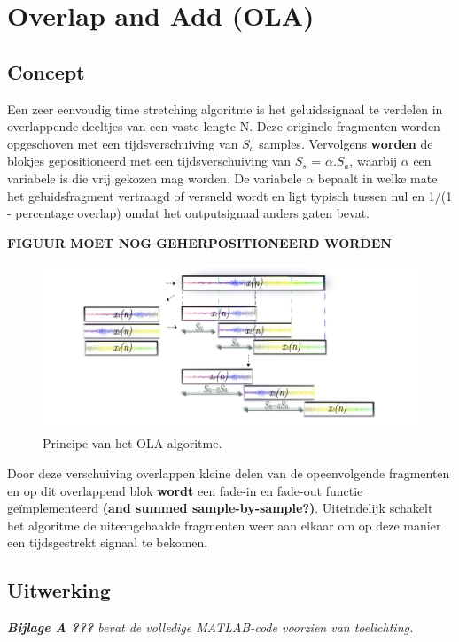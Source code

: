 \documentclass[12pt]{report}
\begin{document}
\section{Overlap and Add (OLA)}
\subsection{Concept}
\label{subsec:OLA_concept}
Een zeer eenvoudig time stretching algoritme is het geluidssignaal te verdelen in overlappende deeltjes van een vaste lengte N. Deze originele fragmenten worden opgeschoven met een tijdsverschuiving van $ S_{a}$ samples. Vervolgens  \textbf{worden}  de blokjes gepositioneerd met een tijdsverschuiving van $S_{s}$ = $\alpha$.$S_{a}$, waarbij $\alpha$ een variabele is die vrij gekozen mag worden. De variabele $\alpha$ bepaalt in welke mate het geluidsfragment vertraagd of versneld wordt en ligt typisch tussen nul en 1/(1 - percentage overlap) omdat het outputsignaal anders gaten bevat. 

\textbf{FIGUUR MOET NOG GEHERPOSITIONEERD WORDEN}

\begin{figure}
\centering
\includegraphics[width=\textwidth]{ola}
\caption{Principe van het OLA-algoritme.}
\label{fig:OLA}
\end{figure}

Door deze verschuiving overlappen kleine delen van de opeenvolgende fragmenten en op dit overlappend blok \textbf{wordt} een fade-in en fade-out functie ge\"{i}mplementeerd \textbf{(and summed sample-by-sample?)}. Uiteindelijk schakelt het algoritme de uiteengehaalde fragmenten weer aan elkaar om op deze manier een tijdsgestrekt signaal te bekomen.

\subsection{Uitwerking}
{\footnotesize \textit{\textbf{Bijlage A ???} bevat de volledige MATLAB-code voorzien van toelichting.}}\\
\end{document}
